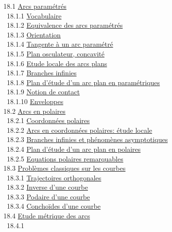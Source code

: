 \documentclass[]{article}
\begin{document}
~18.1 \href{coursse96.html\#x117-53400018.1}{Arcs paramétrés} \\
~~18.1.1 \href{coursse96.html\#x117-53500018.1.1}{Vocabulaire} \\
~~18.1.2 \href{coursse96.html\#x117-53600018.1.2}{Equivalence des arcs
paramétrés} \\ ~~18.1.3
\href{coursse96.html\#x117-53700018.1.3}{Orientation} \\ ~~18.1.4
\href{coursse96.html\#x117-53800018.1.4}{Tangente à un arc paramétré} \\
~~18.1.5 \href{coursse96.html\#x117-53900018.1.5}{Plan osculateur,
concavité} \\ ~~18.1.6 \href{coursse96.html\#x117-54000018.1.6}{Etude
locale des arcs plans} \\ ~~18.1.7
\href{coursse96.html\#x117-54100018.1.7}{Branches infinies} \\ ~~18.1.8
\href{coursse96.html\#x117-54200018.1.8}{Plan d'étude d'un arc plan en
paramétriques} \\ ~~18.1.9
\href{coursse96.html\#x117-54300018.1.9}{Notion de contact} \\ ~~18.1.10
\href{coursse96.html\#x117-54400018.1.10}{Enveloppes} \\ ~18.2
\href{coursse97.html\#x118-54500018.2}{Arcs en polaires} \\ ~~18.2.1
\href{coursse97.html\#x118-54600018.2.1}{Coordonnées polaires} \\
~~18.2.2 \href{coursse97.html\#x118-54700018.2.2}{Arcs en coordonnées
polaires: étude locale} \\ ~~18.2.3
\href{coursse97.html\#x118-54800018.2.3}{Branches infinies et phénomènes
asymptotiques} \\ ~~18.2.4 \href{coursse97.html\#x118-54900018.2.4}{Plan
d'étude d'un arc plan en polaires} \\ ~~18.2.5
\href{coursse97.html\#x118-55000018.2.5}{Equations polaires
remarquables} \\ ~18.3 \href{coursse98.html\#x119-55100018.3}{Problèmes
classiques sur les courbes} \\ ~~18.3.1
\href{coursse98.html\#x119-55200018.3.1}{Trajectoires orthogonales} \\
~~18.3.2 \href{coursse98.html\#x119-55300018.3.2}{Inverse d'une courbe}
\\ ~~18.3.3 \href{coursse98.html\#x119-55400018.3.3}{Podaire d'une
courbe} \\ ~~18.3.4 \href{coursse98.html\#x119-55500018.3.4}{Conchoïdes
d'une courbe} \\ ~18.4 \href{coursse99.html\#x120-55600018.4}{Etude
métrique des arcs} \\ ~~18.4.1
\end{document}
